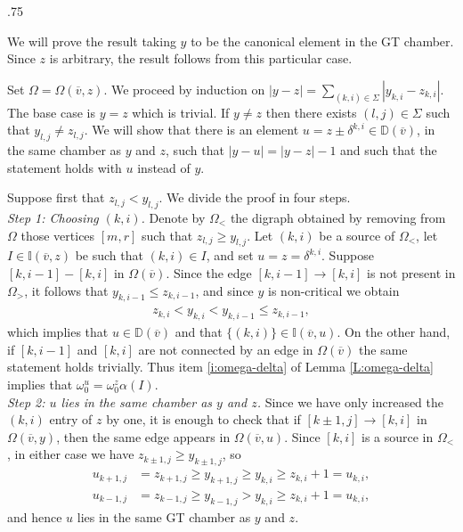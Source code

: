 \documentclass[11pt,fleqn]{amsart}
\makeatletter
\renewcommand\proofname{Proof}
\renewenvironment{proof}[1][\textit{\proofname}]{\par
 \pushQED{\qed}%
 \normalfont \topsep.75\paraskip\relax
 \trivlist
 \item[\hskip\labelsep
 \itshape
 #1\@addpunct{.}]\ignorespaces
}{%
 \popQED\endtrivlist\@endpefalse
}
\newcounter{para}[section]
\newcommand\vv{\overline{v}}
\newcommand\II{\mathbb I}
\newcommand\DD{\mathbb D}
\makeatother
\begin{document}
\begin{proof}
We will prove the result taking $y$ to be the canonical element in the GT 
chamber. Since $z$ is arbitrary, the result follows from this particular case.

Set $\Omega = \Omega(\vv,z)$. We proceed by induction on $|y-z| = \sum_{(k,i) 
\in \Sigma} |y_{k,i} - z_{k,i}|$. The base case is $y = z$ which is trivial. 
If $y \neq z$ then there exists $(l,j) \in \Sigma$ such that $y_{l,j} \neq 
z_{l,j}$. We will show that there is an element $u = z\pm \delta^{k,i} \in 
\DD(\vv)$, in the same chamber as $y$ and $z$, such that $|y-u| = |y-z| -1$
and such that the statement holds with $u$ instead of $y$. 

Suppose first that $z_{l,j} < y_{l,j}$. We divide the proof in four steps. \\

\emph{Step 1: Choosing $(k,i)$.}
Denote by $\Omega_<$ the digraph obtained by removing from $\Omega$ those 
vertices $[m,r]$ such that $z_{l,j} \geq y_{l,j}$. 
Let $(k,i)$ be a source of $\Omega_<$, let $I \in \II(\vv,z)$ be such that 
$(k,i) \in I$, and set $u = z = \delta^{k,i}$. Suppose $[k,i-1] - [k,i]$ in 
$\Omega(\vv)$. Since the edge $[k,i-1] \rightarrow [k,i]$ is not present in 
$\Omega_>$, it follows that $y_{k,i-1} \leq z_{k,i-1}$, and since $y$ is 
non-critical we obtain
\begin{align*}
z_{k,i} < y_{k,i} < y_{k,i-1} \leq z_{k,i-1},
\end{align*}
which implies that $u \in \DD(\vv)$ and that $\{(k,i)\} \in \II(\vv, u)$. On 
the other hand, if $[k,i-1]$ and $[k,i]$ are not connected by an edge in 
$\Omega(\vv)$ the same statement holds trivially. Thus item \ref{i:omega-delta}
of Lemma \ref{L:omega-delta} implies that $\omega_0^u = \omega_0^z 
\alpha(I)$.\\

\emph{Step 2: $u$ lies in the same chamber as $y$ and $z$.}
Since we have only increased the $(k,i)$ entry of $z$ by one, it is enough to 
check that if $[k \pm 1,j] \rightarrow [k,i]$ in $\Omega(\vv,y)$, then the 
same edge appears in $\Omega(\vv,u)$. Since $[k,i]$ is a source in $\Omega_<$, 
in either case we have $z_{k\pm1,j} \geq y_{k \pm 1, j}$, so
\begin{align*}
u_{k+1,j} 
	&= z_{k+1,j} \geq y_{k+1,j} \geq y_{k,i} \geq z_{k,i} + 1 = u_{k,i}, \\ 
u_{k-1,j} &= z_{k-1,j} \geq y_{k-1,j} > y_{k,i} \geq z_{k,i} + 1 = u_{k,i},
\end{align*}
and hence $u$ lies in the same GT chamber as $y$ and $z$. \\


\end{proof}
\end{document}
